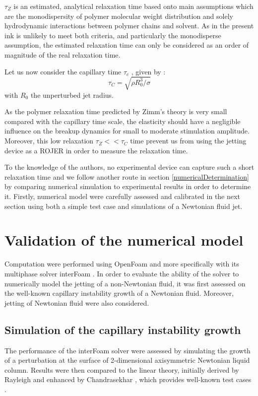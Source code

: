 \documentclass[twocolumn,10pt]{asme2ej}
\begin{document}
$\tau_Z$ is an estimated, analytical relaxation time based onto main assumptions which are the monodispersity of polymer molecular weight distribution and solely hydrodynamic interactions between polymer chains and solvent. As in the present ink is unlikely to meet both criteria, and particularly the monodisperse assumption, the estimated relaxation time can only be considered as an order of magnitude of the real relaxation time.


Let us now consider the capillary time $\tau_c$ , given by :
\begin{equation}
    \tau_C= \sqrt{\rho R_0^3 / \sigma}
\end{equation}
with $R_0$ the unperturbed jet radius. 

As the polymer relaxation time predicted by Zimm's theory is very small compared with the capillary time scale, the elasticity should have a negligible influence on the breakup dynamics for small to moderate stimulation amplitude. Moreover, this low relaxation $\tau_Z<<\tau_C$ time prevent us from using the jetting device as a ROJER \cite{keshavarz2015studying} in order to measure the relaxation time. 

To the knowledge of the authors, no experimental device can capture such a short relaxation time and we follow another route in section \ref{numericalDetermination} by comparing numerical simulation to experimental results in order to determine it. Firstly, numerical model were carefully assessed and calibrated in the next section using both a simple test case and simulations of a Newtonian fluid jet.

\section{Validation of the numerical model}
Computation were performed using {OpenFoam\textregistered} and more specifically with its multiphase solver interFoam \cite{deshpande2012evaluating}. In order to evaluate the ability of the solver to numerically model the jetting of a non-Newtonian fluid, it was first assessed on the well-known capillary instability growth of a Newtonian fluid. Moreover, jetting of Newtonian fluid were also considered.

\subsection{Simulation of the capillary instability growth}
The performance of the interFoam solver were assessed by simulating the growth of a perturbation at the surface of 2-dimensional axisymmetric Newtonian liquid column. Results were then compared to the linear theory, initially derived by Rayleigh \cite{rayleigh1892xvi} and enhanced by Chandrasekhar \cite{chandrasekhar2013hydrodynamic}, which provides well-known test cases \cite{delteil2011numerical,cervone2010simulation}.
\end{document}
